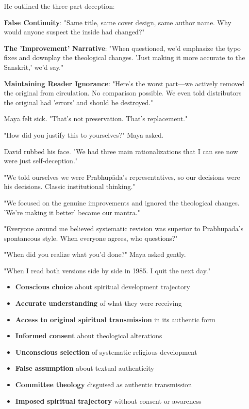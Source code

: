\documentclass[12pt,twoside]{book}
\begin{document}
He outlined the three-part deception:

\textbf{\textbf{False Continuity}}: "Same title, same cover design, same author name. Why would anyone suspect the inside had changed?"

\textbf{\textbf{The 'Improvement' Narrative}}: "When questioned, we'd emphasize the typo fixes and downplay the theological changes. 'Just making it more accurate to the Sanskrit,' we'd say."

\textbf{\textbf{Maintaining Reader Ignorance}}: "Here's the worst part—we actively removed the original from circulation. No comparison possible. We even told distributors the original had 'errors' and should be destroyed."

Maya felt sick. "That's not preservation. That's replacement."

"How did you justify this to yourselves?" Maya asked.

David rubbed his face. "We had three main rationalizations that I can see now were just self-deception."

"We told ourselves we were Prabhupāda's representatives, so our decisions were his decisions. Classic institutional thinking."

"We focused on the genuine improvements and ignored the theological changes. 'We're making it better' became our mantra."

"Everyone around me believed systematic revision was superior to Prabhupāda's spontaneous style. When everyone agrees, who questions?"

"When did you realize what you'd done?" Maya asked gently.

"When I read both versions side by side in 1985. I quit the next day."

\begin{itemize}
\item \textbf{\textbf{Conscious choice}} about spiritual development trajectory
\item \textbf{\textbf{Accurate understanding}} of what they were receiving
\item \textbf{\textbf{Access to original spiritual transmission}} in its authentic form
\item \textbf{\textbf{Informed consent}} about theological alterations

\item \textbf{\textbf{Unconscious selection}} of systematic religious development
\item \textbf{\textbf{False assumption}} about textual authenticity
\item \textbf{\textbf{Committee theology}} disguised as authentic transmission
\item \textbf{\textbf{Imposed spiritual trajectory}} without consent or awareness
\end{itemize}
\end{document}
